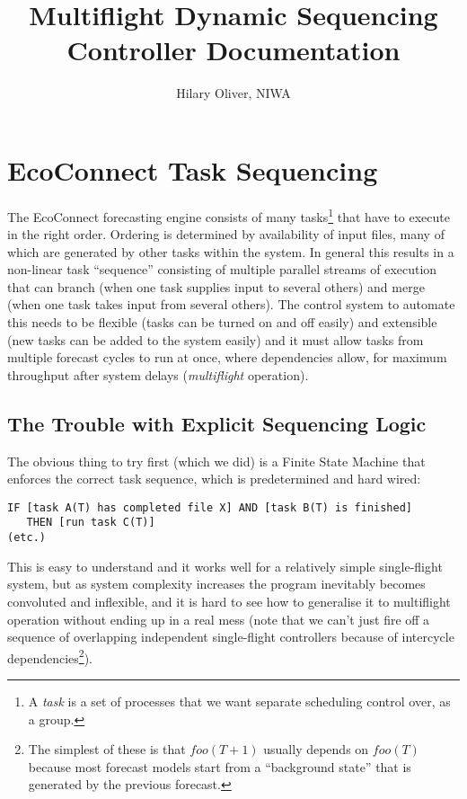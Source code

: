 \documentclass[12pt]{article}
\title{Multiflight Dynamic Sequencing Controller Documentation}
\author{Hilary Oliver, NIWA}
\begin{document}
\maketitle

\section{EcoConnect Task Sequencing} 

The EcoConnect forecasting engine consists of many tasks\footnote{A {\em
task} is a set of processes that we want separate scheduling control
over, as a group.} that have to execute in the right order. Ordering is
determined by availability of input files, many of which are generated
by other tasks within the system.  In general this results in a
non-linear task ``sequence'' consisting of multiple parallel streams of
execution that can branch (when one task supplies input to several
others) and merge (when one task takes input from several others). The
control system to automate this needs to be flexible (tasks can be
turned on and off easily) and extensible (new tasks can be added to the
system easily) and it must allow tasks from multiple forecast cycles to
run at once, where dependencies allow, for maximum throughput after
system delays ({\em multiflight} operation). 


\subsection{The Trouble with Explicit Sequencing Logic}

The obvious thing to try first (which we did) is a Finite State Machine
that enforces the correct task sequence, which is predetermined and hard
wired: 
\begin{verbatim}
IF [task A(T) has completed file X] AND [task B(T) is finished]
   THEN [run task C(T)] 
(etc.)
\end{verbatim} 

This is easy to understand and it works well for a relatively simple
single-flight system, but as system complexity increases the program
inevitably becomes convoluted and inflexible, and it is hard to see how
to generalise it to multiflight operation without ending up in a real
mess (note that we can't just fire off a sequence of overlapping
independent single-flight controllers because of intercycle
dependencies\footnote{The simplest of these is that $foo(T+1)$ usually
depends on $foo(T)$ because most forecast models start from a
``background state'' that is generated by the previous forecast.}). 
\end{document}
